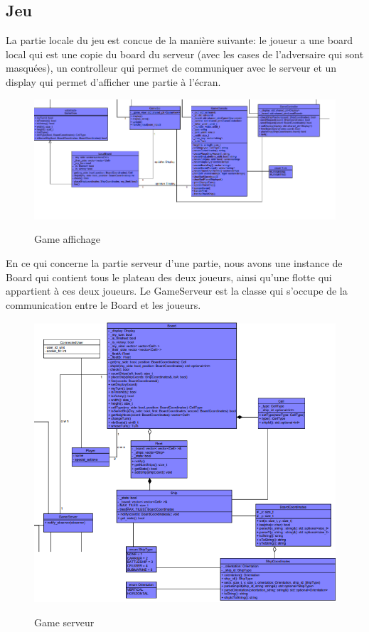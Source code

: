 \documentclass[../design_fonctionnement_sys.tex]{subfiles}
\begin{document}
\subsection{Jeu}
La partie locale du jeu est concue de la manière suivante: 
le joueur a une board local qui est une copie du board du serveur (avec les cases de l'adversaire qui sont masquées), 
un controlleur qui permet de communiquer avec le serveur et un display qui permet d'afficher une partie à l'écran.
\begin{figure}[H]
    \centering
    \includegraphics[scale=0.6]{img_design/Game_client.png}
    \label{fig:seq_match_server}
    \caption{Game affichage}
\end{figure}

En ce qui concerne la partie serveur d'une partie, nous avons une instance de Board qui contient tous le plateau des deux joueurs, 
ainsi qu'une flotte qui appartient à ces deux joueurs. Le GameServeur est la classe qui s'occupe de la communication entre le Board et les joueurs.
\begin{figure}[H]
    \centering
    \includegraphics[scale=0.6]{img_design/Game_serveur.png}
    \label{fig:seq_match_server}
    \caption{Game serveur}
\end{figure}
\end{document}
